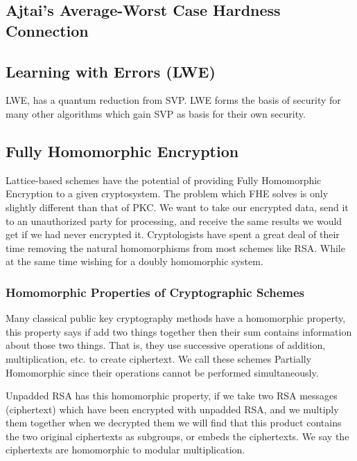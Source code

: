 \subsection{Ajtai's Average-Worst Case Hardness Connection}

\subsection{Learning with Errors (LWE)}

LWE, has a quantum reduction from SVP. LWE forms the basis of security for many other algorithms which gain SVP as basis for their own security.
 
 
\subsection{Fully Homomorphic Encryption} 
Lattice-based schemes have the potential of providing Fully Homomorphic Encryption to a given cryptosystem. 
The problem which FHE solves is only slightly different than that of PKC. We want to take our encrypted data, send it to an unauthorized party for processing, 
and receive the same results we would get if we had never encrypted it.
\newline
Cryptologists have spent a great deal of their time removing the natural homomorphisms from most schemes like RSA. While at the same time wishing for a doubly homomorphic system. 


\newline

\subsubsection{Homomorphic Properties of Cryptographic Schemes} 
Many classical public key cryptography methods have a homomorphic property, this property says if add two things together then their sum contains information about those two things.
That is, they use successive operations of addition, multiplication, etc. to create ciphertext. 
We call these schemes Partially Homomorphic since their operations cannot be performed simultaneously. 

Unpadded RSA has this homomorphic property, if we take two RSA messages (ciphertext) which have been encrypted with unpadded RSA, and we multiply them together when we decrypted them we will find that this product contains the two original ciphertexts as subgroups, or embeds the ciphertexts. We say the ciphertexts are homomorphic to modular multiplication. 

